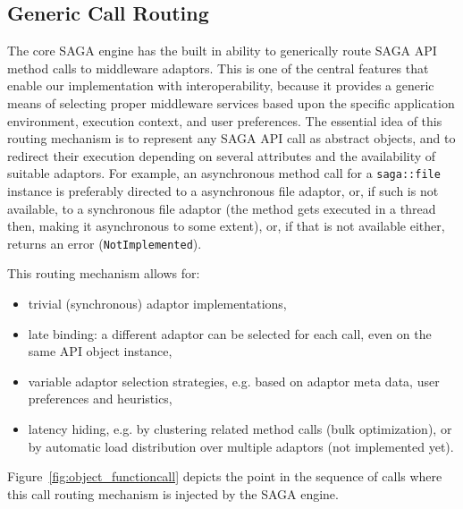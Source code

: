 \documentclass[conference,final]{IEEEtran}
\newcommand{\T}{\texttt}
\newenvironment{shortlist}{
  \begin{itemize}
  \setlength{\itemsep}{-0.1em}
}{
  \end{itemize}
}
\begin{document}
\subsection{Generic Call Routing}
\label{ssec:routing}

The core SAGA engine has the built in ability to generically route
SAGA API method calls to middleware adaptors. This is one of the
central features that enable our implementation with interoperability,
because it provides a generic means of selecting proper middleware
services based upon the specific application environment, execution
context, and user preferences.  The essential idea of this routing
mechanism is to represent any SAGA API call as abstract objects, and
to redirect their execution depending on several attributes and the
availability of suitable adaptors.  For example, an asynchronous
method call for a \T{saga::file} instance is preferably directed to a
asynchronous file adaptor, or, if such is not available, to a
synchronous file adaptor (the method gets executed in a thread then,
making it asynchronous to some extent), or, if that is not available
either, returns an error (\T{NotImplemented}).

This routing mechanism allows for: 
\begin{shortlist}
   \item trivial (synchronous) adaptor implementations, 
   \item late binding: a different adaptor can be selected
         for each call, even on the same API object instance, 
   \item variable adaptor selection strategies, e.g. 
         based on adaptor meta data, user preferences and heuristics, 
   \item latency hiding, e.g. by clustering related method calls (bulk
         optimization), or by automatic load distribution over multiple 
         adaptors (not implemented yet).
\end{shortlist}

Figure~\ref{fig:object_functioncall} depicts the point in the sequence of calls
where this call routing mechanism is injected by the SAGA engine.
\end{document}
